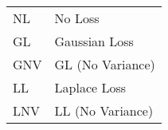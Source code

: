 \begin{tabular}{|l|l|} 
    \hline
     NL  & No Loss           \\
     GL  & Gaussian Loss     \\
     GNV & GL (No Variance)  \\
     LL  & Laplace Loss      \\
     LNV & LL (No Variance)  \\ 
     \hline
\end{tabular}